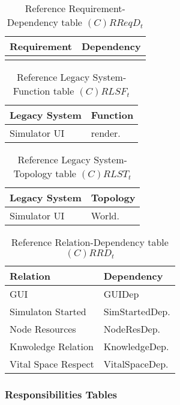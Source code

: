 \begin{table}[H]
	\centering
	\begin{tabular}{|p{4cm}|p{8cm}|}
			\hline
			\textbf{Requirement} & \textbf{Dependency} \\
			\hline
			 & \\
			\hline
		\end{tabular}
		\caption{Reference Requirement-Dependency table $(C)RReqD_t$}
	\label{tab:crreqdt}
\end{table}

\begin{table}[H]
	\centering
	\begin{tabular}{|p{4cm}|p{8cm}|}
			\hline
			\textbf{Legacy System} & \textbf{Function} \\
			\hline
			Simulator UI & render. \\
			\hline
		\end{tabular}
	\caption{Reference Legacy System-Function table $(C)RLSF_t$}
	\label{tab:crlsft}
\end{table}

\begin{table}[H]
	\centering
	\begin{tabular}{|p{4cm}|p{8cm}|}
			\hline
			\textbf{Legacy System} & \textbf{Topology} \\
			\hline
			Simulator UI & World. \\
			\hline
		\end{tabular}
	\caption{Reference Legacy System-Topology table $(C)RLST_t$}
	\label{tab:crlsTt}
\end{table}

\begin{table}[H]
	\centering
	\begin{tabular}{|p{4cm}|p{8cm}|}
			\hline
			\textbf{Relation} & \textbf{Dependency} \\
			\hline
			GUI & GUIDep \\
			\hline
			Simulaton Started & SimStartedDep. \\
			\hline
			Node Resources & NodeResDep. \\
			\hline
			Knwoledge Relation & KnowledgeDep. \\
			\hline
			Vital Space Respect & VitalSpaceDep. \\
			\hline
		\end{tabular}
	\caption{Reference Relation-Dependency table $(C)RRD_t$}
	\label{tab:crrdt}
\end{table}

\subsubsection{Responsibilities Tables}

